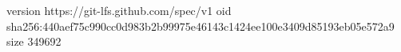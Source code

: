 version https://git-lfs.github.com/spec/v1
oid sha256:440aef75c990cc0d983b2b99975e46143c1424ee100e3409d85193eb05e572a9
size 349692

